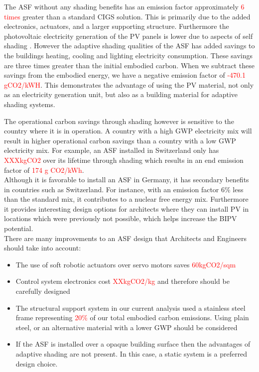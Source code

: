 
The ASF without any shading benefits has an emission factor approximately \textcolor{red}{6 times } greater than a standard CIGS solution. This is primarily due to the added electronics, actuators, and a larger supporting structure. Furthermore the photovoltaic electricity generation of the PV panels is lower due to aspects of self shading \cite{hofer2015photovoltaics}. However the adaptive shading qualities of the ASF has added savings to the buildings heating, cooling and lighting electricity consumption. These savings are three times greater than the initial embodied carbon. When we subtract these savings from the embodied energy, we have a negative emission factor of \textcolor{red}{-470.1 gCO2/kWH}. This demonstrates the advantage of using the PV material, not only as an electricity generation unit, but also as a building material for adaptive shading systems.


The operational carbon savings through shading however is sensitive to the country where it is in operation. A country with a high GWP electricity mix will result in higher operational carbon savings than a country with a low GWP electricity mix. For example, an ASF installed in Switzerland only has \textcolor{red}{XXXkgCO2} over its lifetime through shading which results in an end emission factor of \textcolor{red}{174 g CO2/kWh}. \\

Although it is favorable to install an ASF in Germany, it has secondary benefits in countries such as Switzerland. For instance, with an emission factor 6\% less than the standard mix, it contributes to a nuclear free energy mix. Furthermore it provides interesting design options for architects where they can install PV in locations which were previously not possible, which helps increase the BIPV potential.  \\

There are many improvements to an ASF design that Architects and Engineers should take into account: 
\begin{itemize}
\item The use of soft robotic actuators over servo motors saves \textcolor{red}{60kgCO2/sqm}
\item Control system electronics cost \textcolor{red}{XXkgCO2/kg} and therefore should be carefully designed
\item The structural support system in our current analysis used a stainless steel frame representing \textcolor{red}{20\%} of our total embodied carbon emissions. Using plain steel, or an alternative material with a lower GWP should be considered
\item If the ASF is installed over a opaque building surface then the advantages of adaptive shading are not present. In this case, a static system is a preferred design choice. 
\end{itemize}


